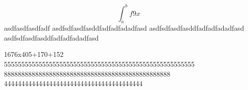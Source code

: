 \begin{equation*}
    \int_{a}^{b} f9x
\end{equation*}
asdfasdfasdfadf
asdfsdfasdfasddfadfadfadadfasd
asdfsdfasdfasddfadfadfadadfasd
asdfsdfasdfasddfadfadfadadfasd

1676x405+170+152
5555555555555555555555555555555555555555555555555555555
888888888888888888888888888888888888888888888888
4444444444444444444444444444444444444444
